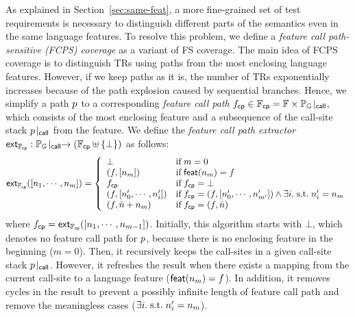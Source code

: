 As explained in Section~\ref{sec:same-feat}, a more fine-grained set of test
requirements is necessary to distinguish different parts of the semantics even
in the same language features.
%
To resolve this problem, we define a \textit{feature call path-sensitive (FCPS)
coverage} as a variant of FS coverage.
%
The main idea of FCPS coverage is to distinguish TRs using paths from the most
enclosing language features.
%
However, if we keep paths as it is, the number of TRs exponentially increases
because of the path explosion caused by sequential branches.
%
Hence, we simplify a path $p$ to a corresponding \textit{feature call path}
$f_{\textsf{cp}} \in \mathbb{F}_{\textsf{cp}} = \mathbb{F} \times {\mathbb{P}_{\mathbb{G}}}\!\mid_{\textsf{call}}$, which consists of
the most enclosing feature and a subsequence of the call-site stack
${p}\!\mid_{\textsf{call}}$ from the feature.
%
We define the \textit{feature call path extractor} $\textsf{ext}_{\mathbb{F}_{\textsf{cp}}}:
{\mathbb{P}_{\mathbb{G}}}\!\mid_{\textsf{call}} \rightarrow (\mathbb{F}_{\textsf{cp}} \uplus \{ \bot \})$ as follows:
%
\begin{equation}\label{equ:extfcp}
  \textsf{ext}_{\mathbb{F}_{\textsf{cp}}}([n_1, \cdots, n_m]) = \left\{
    \begin{array}{ll}
      \bot & \text{if} \; m = 0\\

      (f, [n_m]) & \text{if} \; \textsf{feat}(n_m) = f\\

      f_{\textsf{cp}} & \text{if} \; f_{\textsf{cp}} = \bot\\

      (f, [n'_0, \cdots, n'_i]) &
      \text{if} \; f_{\textsf{cp}} = (f, [n'_0, \cdots, n'_{m'}]) \wedge
      \exists i. {\; \text{s.t.} \; } n'_i = n_m\\

      (f, \bar{n} + n_m) & \text{if} \; f_{\textsf{cp}} = (f, \bar{n})\\
    \end{array}
  \right.
\end{equation}
%
where $f_{\textsf{cp}} = \textsf{ext}_{\mathbb{F}_{\textsf{cp}}}([n_1, \cdots, n_{m-1}])$.
%
Initially, this algorithm starts with $\bot$, which denotes no feature call path
for $p$, because there is no enclosing feature in the beginning ($m = 0$).
%
Then, it recursively keeps the call-sites in a given call-site
stack ${p}\!\mid_{\textsf{call}}$.
%
However, it refreshes the result when there exists a mapping from the current
call-site to a language feature ($\textsf{feat}(n_m) = f$).
%
In addition, it removes cycles in the result to prevent a possibly infinite
length of feature call path and remove the meaningless cases ($\exists i. {\; \text{s.t.} \; }
n'_i = n_m$).

